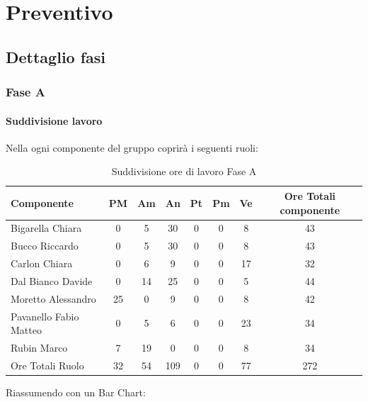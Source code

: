 \section{Preventivo}
	\subsection{Dettaglio fasi}
		\subsubsection{Fase A}
			\paragraph{Suddivisione lavoro}
				Nella  ogni componente del gruppo \groupname{} coprirà i seguenti ruoli:
				\begin{table}[H]
					\begin{center}
						\begin{tabular}{| l | c | c | c | c | c | c | c |}
							\hline
							Componente 				& PM	& Am 	& An 	& Pt 		& Pm 	& Ve 	& Ore Totali componente \\ \hline
							
							Bigarella Chiara 			& 0		& 5 		& 30 		& 0		& 0		& 8 		& 43 \\
							Bucco Riccardo 			& 0		& 5 		& 30 		& 0		& 0		& 8 		& 43 \\
							Carlon Chiara	 			& 0		& 6 		& 9 		& 0		& 0		& 17 		& 32 \\
							Dal Bianco Davide 			& 0		& 14 		& 25 		& 0		& 0		& 5 		& 44 \\
							Moretto Alessandro 			& 25 		& 0		& 9 		& 0		& 0		& 8 		& 42 \\
							Pavanello Fabio Matteo	 	& 0		& 5 		& 6 		& 0		& 0		& 23 		& 34 \\
							Rubin Marco				& 7 		& 19 		& 0		& 0		& 0		& 8 		& 34 \\ \hline \hline
							
							Ore Totali Ruolo 			& 32 		& 54 		& 109 	& 0		& 0		& 77 		& 272\\ \hline
						\end{tabular}
					\end{center}
					\caption{Suddivisione ore di lavoro Fase A}
				\end{table}
				Riassumendo con un Bar Chart:
